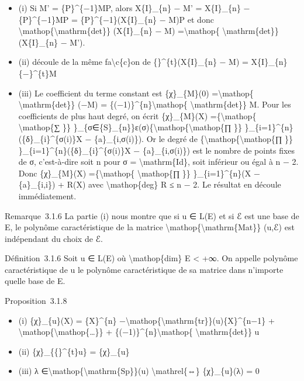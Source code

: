 \documentclass[]{article}
\begin{document}
\begin{itemize}
\itemsep1pt\parskip0pt
\item
  (i) Si M' = \{P\}\^{}\{−1\}MP, alors X\{I\}\_\{n\} − M' =
  X\{I\}\_\{n\} − \{P\}\^{}\{−1\}MP = \{P\}\^{}\{−1\}(X\{I\}\_\{n\} −
  M)P et donc \textbackslash{}mathop\{\textbackslash{}mathrm\{det\}\}
  (X\{I\}\_\{n\} − M) =\textbackslash{}mathop\{
  \textbackslash{}mathrm\{det\}\} (X\{I\}\_\{n\} − M').
\item
  (ii) découle de la même fa\textbackslash{}c\{c\}on de
  \{\}\^{}\{t\}(X\{I\}\_\{n\} − M) = X\{I\}\_\{n\} \{−\}\^{}\{t\}M
\item
  (iii) Le coefficient du terme constant est \{χ\}\_\{M\}(0)
  =\textbackslash{}mathop\{ \textbackslash{}mathrm\{det\}\} (−M) =
  \{(−1)\}\^{}\{n\}\textbackslash{}mathop\{
  \textbackslash{}mathrm\{det\}\} M. Pour les coefficients de plus haut
  degré, on écrit \{χ\}\_\{M\}(X) =\{\textbackslash{}mathop\{
  \textbackslash{}mathop\{∑ \}\}
  \}\_\{σ∈\{S\}\_\{n\}\}ε(σ)\{\textbackslash{}mathop\{\textbackslash{}mathop\{∏
  \}\} \}\_\{i=1\}\^{}\{n\}(\{δ\}\_\{i\}\^{}\{σ(i)\}X −
  \{a\}\_\{i,σ(i)\}). Or le degré de
  \{\textbackslash{}mathop\{\textbackslash{}mathop\{∏ \}\}
  \}\_\{i=1\}\^{}\{n\}(\{δ\}\_\{i\}\^{}\{σ(i)\}X − \{a\}\_\{i,σ(i)\})
  est le nombre de points fixes de σ, c'est-à-dire soit n pour σ =
  \textbackslash{}mathrm\{Id\}, soit inférieur ou égal à n − 2. Donc
  \{χ\}\_\{M\}(X) =\{\textbackslash{}mathop\{ \textbackslash{}mathop\{∏
  \}\} \}\_\{i=1\}\^{}\{n\}(X − \{a\}\_\{i,i\}) + R(X) avec
  \textbackslash{}mathop\{deg\} R ≤ n − 2. Le résultat en découle
  immédiatement.
\end{itemize}

Remarque~3.1.6 La partie (i) nous montre que si u ∈ L(E) et si ℰ est une
base de E, le polynôme caractéristique de la matrice
\textbackslash{}mathop\{\textbackslash{}mathrm\{Mat\}\} (u,ℰ) est
indépendant du choix de ℰ.

Définition~3.1.6 Soit u ∈ L(E) où \textbackslash{}mathop\{dim\} E
\textless{} +∞. On appelle polynôme caractéristique de u le polynôme
caractéristique de sa matrice dans n'importe quelle base de E.

Proposition~3.1.8

\begin{itemize}
\itemsep1pt\parskip0pt
\item
  (i) \{χ\}\_\{u\}(X) = \{X\}\^{}\{n\}
  −\textbackslash{}mathop\{\textbackslash{}mathrm\{tr\}\}(u)\{X\}\^{}\{n−1\}
  + \textbackslash{}mathop\{\textbackslash{}mathop\{\ldots{}\}\} +
  \{(−1)\}\^{}\{n\}\textbackslash{}mathop\{
  \textbackslash{}mathrm\{det\}\} u
\item
  (ii) \{χ\}\_\{\{\}\^{}\{t\}u\} = \{χ\}\_\{u\}
\item
  (iii) λ ∈\textbackslash{}mathop\{\textbackslash{}mathrm\{Sp\}\}(u)
  \textbackslash{}mathrel\{⇔\} \{χ\}\_\{u\}(λ) = 0
\end{itemize}
\end{document}
